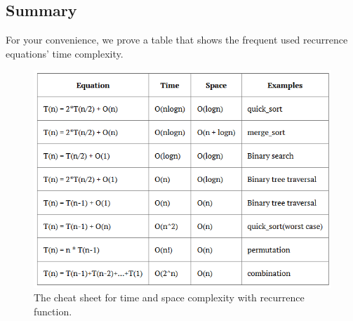 \documentclass[../algorithms.tex]{subfiles}
\begin{document}
\subsection{Summary}
For your convenience, we prove a table that shows the frequent used recurrence equations' time complexity. 
\begin{figure}[h]
    \centering
    \includegraphics[width=1\columnwidth] {fig/complexity_cheatsheet.png}
    \caption{The cheat sheet for time and space complexity with recurrence function.}
    \label{fig:cheat_sheet}
\end{figure}
\end{document}

